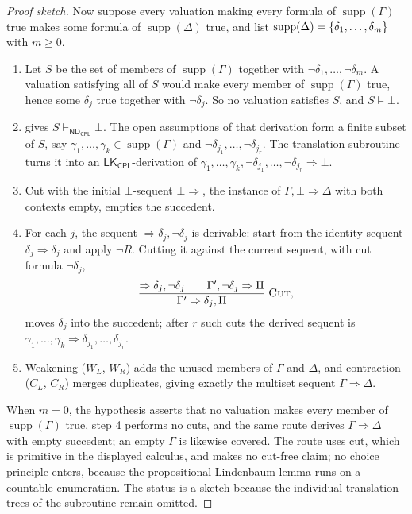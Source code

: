 \documentclass[11pt,oneside,openany]{book}
\theoremstyle{definition}
\theoremstyle{plain}
\theoremstyle{remark}
\DeclarePairedDelimiter{\set}{\lbrace}{\rbrace}
\newcommand{\entails}{\models}
\newcommand{\derives}{\vdash}
\newcommand{\bottom}{\bot}
\newcommand{\ND}{\mathsf{ND}}
\newcommand{\LK}{\mathsf{LK}}
\newcommand{\CPL}{\mathsf{CPL}}
\newcommand{\Rule}[3][]{\frac{#2}{#3}\;\textsc{#1}}
\begin{document}
\begin{proof}[Proof sketch]
Now suppose every valuation making every formula of
\(\operatorname{supp}(\Gamma)\) true makes some formula of
\(\operatorname{supp}(\Delta)\) true, and list
\(\operatorname{supp}(\Delta)=\set{\delta_1,\ldots,\delta_m}\) with
\(m\geq0\).
\begin{enumerate}
  \item Let \(S\) be the set of members of
        \(\operatorname{supp}(\Gamma)\) together with
        \(\neg\delta_1,\ldots,\neg\delta_m\).  A valuation satisfying
        all of \(S\) would make every member of
        \(\operatorname{supp}(\Gamma)\) true, hence some
        \(\delta_j\) true together with \(\neg\delta_j\).  So no
        valuation satisfies \(S\), and \(S\entails\bottom\).
  \item {} gives
        \(S\derives_{\ND_{\CPL}}\bottom\).  The open assumptions of
        that derivation form a finite subset of \(S\), say
        \(\gamma_1,\ldots,\gamma_k\in\operatorname{supp}(\Gamma)\) and
        \(\neg\delta_{j_1},\ldots,\neg\delta_{j_r}\).  The translation
        subroutine turns it into an \(\LK_{\CPL}\)-derivation of
        \(\gamma_1,\ldots,\gamma_k,
        \neg\delta_{j_1},\ldots,\neg\delta_{j_r}\Rightarrow\bottom\).
  \item Cut with the initial \(\bottom\)-sequent
        \(\bottom\Rightarrow\), the instance of
        \(\Gamma,\bottom\Rightarrow\Delta\) with both contexts empty,
        empties the succedent.
  \item For each \(j\), the sequent
        \(\Rightarrow\delta_j,\neg\delta_j\) is derivable: start from
        the identity sequent \(\delta_j\Rightarrow\delta_j\) and apply
        \(\neg R\).  Cutting it against the current sequent, with cut
        formula \(\neg\delta_j\),
        \[
         \Rule[Cut]{\Rightarrow\delta_j,\neg\delta_j\qquad
          \Gamma',\neg\delta_j\Rightarrow\Pi}
          {\Gamma'\Rightarrow\delta_j,\Pi},
        \]
        moves \(\delta_j\) into the succedent; after \(r\) such cuts
        the derived sequent is
        \(\gamma_1,\ldots,\gamma_k\Rightarrow
        \delta_{j_1},\ldots,\delta_{j_r}\).
  \item Weakening (\(W_L\), \(W_R\)) adds the unused members of
        \(\Gamma\) and \(\Delta\), and contraction (\(C_L\),
        \(C_R\)) merges duplicates, giving exactly the multiset
        sequent \(\Gamma\Rightarrow\Delta\).
\end{enumerate}
When \(m=0\), the hypothesis asserts that no valuation makes every
member of \(\operatorname{supp}(\Gamma)\) true, step 4 performs no cuts,
and the same route derives \(\Gamma\Rightarrow\Delta\) with empty
succedent; an empty \(\Gamma\) is likewise covered.  The route uses cut,
which is primitive in the displayed calculus, and makes no cut-free
claim; no choice principle enters, because the propositional Lindenbaum
lemma runs on a countable enumeration.  The status is a sketch because
the individual translation trees of the subroutine remain omitted.
\end{proof}
\end{document}
